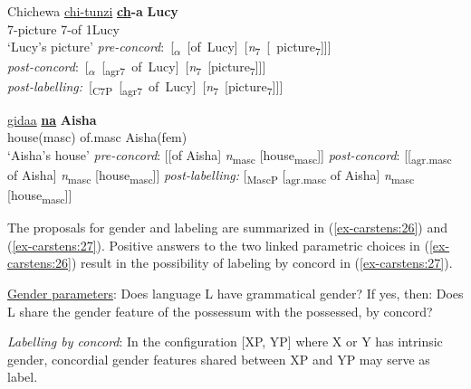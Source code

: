 \documentclass[output=paper
,modfonts
,nonflat]{langsci/langscibook}
\begin{document}
\begin{exe} \settowidth{}
	\ex \label{ex-carstens:24}
	\xlist
	\ex Chichewa\label{ex-carstens:24a} \newline
	\gll \uline{chi-tunzi}    \textbf{\uline{ch}-a}  \textbf{Lucy} \\
	7-picture    7-of     1Lucy\\
	\glt `Lucy’s picture'  	
	\ex\label{ex-carstens:24b} \mbox{\textit{pre-concord}:   [\textsubscript{$\alpha$} [of Lucy] [\textit{n}\textsubscript{7} [ picture\textsubscript{7}]]]}\\  
	\ex\label{ex-carstens:24c} \mbox{\textit{post-concord}:   [\textsubscript{$\alpha$} [\textsubscript{agr7} of Lucy] [\textit{n}\textsubscript{7} [picture\textsubscript{7}]]]}\\ 
	\ex\label{ex-carstens:24d} \mbox{\textit{post-labelling:} [\textsubscript{C7P} [\textsubscript{agr7} of Lucy] [\textit{n}\textsubscript{7} [picture\textsubscript{7}]]]}\\ 
	\endxlist
\end{exe}
\begin{exe} 
	\ex \label{ex-carstens:25}
	\xlist
	\ex 
	\gll \uline{gidaa}    \textbf{\uline{na}}  \textbf{Aisha} \\
	house(masc)   of.masc   Aisha(fem)\\
	\glt `Aisha's house'  	
	\ex \textit{pre-concord}:   [[of Aisha] \textit{n}\textsubscript{masc} [house\textsubscript{masc}]]
	\ex \textit{post-concord}:   [[\textsubscript{agr.masc} of Aisha] \textit{n}\textsubscript{masc} [house\textsubscript{masc}]]
	\ex \textit{post-labelling:} [\textsubscript{MascP} [\textsubscript{agr.masc} of Aisha] \textit{n}\textsubscript{masc} [house\textsubscript{masc}]]
	\endxlist
\end{exe}
The proposals for gender and labeling are summarized in (\ref{ex-carstens:26}) and (\ref{ex-carstens:27}). Positive answers to the two linked parametric choices in (\ref{ex-carstens:26}) result in the possibility of labeling by concord in (\ref{ex-carstens:27}). 

\begin{exe}
\ex \label{ex-carstens:26} \uline{Gender parameters}:
\xlist
\ex Does language L have grammatical gender? If yes, then:                   
\ex Does L share the gender feature of the possessum with the possessed, by concord?
\endxlist
\end{exe}
\begin{exe}
\ex \label{ex-carstens:27}
\textit{Labelling by concord}: In the configuration [XP, YP] where X or Y has intrinsic gender, concordial gender features shared between XP and YP may serve as label.
\end{exe}
\end{document}

